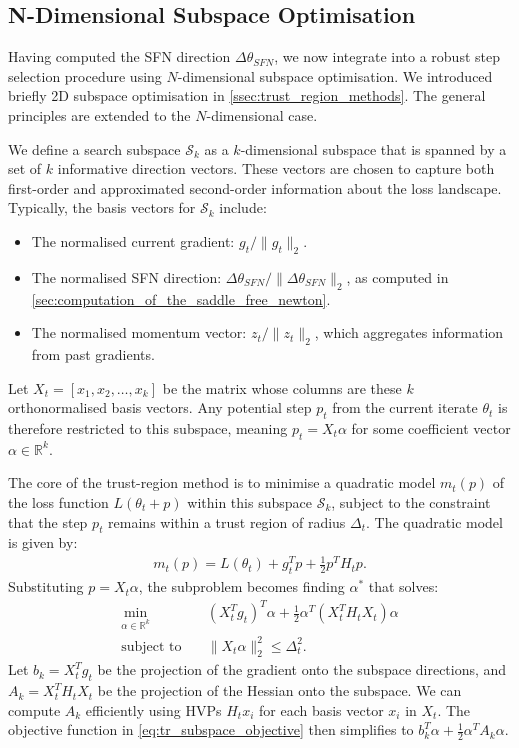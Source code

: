 \subsection{N-Dimensional Subspace Optimisation}
\label{sec:n_dimensional_subspace_optimisation}

Having computed the SFN direction $\Delta \theta_{SFN}$, we now integrate into a robust step selection procedure using $N$-dimensional subspace optimisation. We introduced briefly 2D subspace optimisation in \cref{ssec:trust_region_methods}. The general principles are extended to the $N$-dimensional case. 

We define a search subspace $\mathcal{S}_k$ as a $k$-dimensional subspace that is spanned by a set of $k$ informative direction vectors. These vectors are chosen to capture both first-order and approximated second-order information about the loss landscape. Typically, the basis vectors for $\mathcal{S}_k$ include:
\begin{itemize}
    \item The normalised current gradient: $g_t / \|g_t\|_2$.
    \item The normalised SFN direction: $\Delta \theta_{SFN} / \|\Delta \theta_{SFN}\|_2$, as computed in \cref{sec:computation_of_the_saddle_free_newton}.
    \item The normalised momentum vector: $z_t / \|z_t\|_2$, which aggregates information from past gradients.
\end{itemize}
Let $X_t = [x_1, x_2, \ldots, x_k]$ be the matrix whose columns are these $k$ orthonormalised basis vectors. Any potential step $p_t$ from the current iterate $\theta_t$ is therefore restricted to this subspace, meaning $p_t = X_t \alpha$ for some coefficient vector $\alpha \in \mathbb{R}^k$.

The core of the trust-region method is to minimise a quadratic model $m_t(p)$ of the loss function $L(\theta_t + p)$ within this subspace $\mathcal{S}_k$, subject to the constraint that the step $p_t$ remains within a trust region of radius $\Delta_t$. The quadratic model is given by:
\begin{align}
    m_t(p) = L(\theta_t) + g_t^T p + \frac{1}{2} p^T H_t p.
\end{align}
Substituting $p = X_t \alpha$, the subproblem becomes finding $\alpha^*$ that solves:
\begin{align}
    \min_{\alpha \in \mathbb{R}^k} & \quad (X_t^T g_t)^T \alpha + \frac{1}{2} \alpha^T (X_t^T H_t X_t) \alpha \label{eq:tr_subspace_objective} \\
    \text{subject to} & \quad \|X_t \alpha\|_2^2 \leq \Delta_t^2. \label{eq:tr_subspace_constraint}
\end{align}
Let $b_k = X_t^T g_t$ be the projection of the gradient onto the subspace directions, and $A_k = X_t^T H_t X_t$ be the projection of the Hessian onto the subspace. We can compute $A_k$ efficiently using HVPs $H_t x_i$ for each basis vector $x_i$ in $X_t$. The objective function in \cref{eq:tr_subspace_objective} then simplifies to $b_k^T \alpha + \frac{1}{2} \alpha^T A_k \alpha$.

